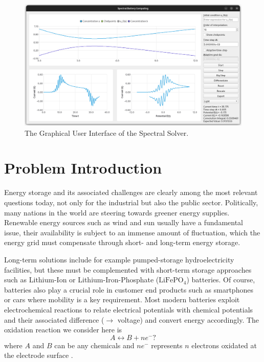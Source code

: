 \documentclass{prettytex/ox/mmsc-special-topic}
\begin{document}
  \begin{figure}[H]
    \centering
    \includegraphics[width=\linewidth]{figures/screenshot.png}
    \caption{The Graphical User Interface of the Spectral Solver.}
  \end{figure}

  \pagebreak
  \pagestyle{normal}

  \tableofcontents
  \pagebreak

  \section{Problem Introduction}
  \label{sec:introduction}
  Energy storage and its associated challenges are clearly among the most relevant questions today, not only for the industrial but also the public sector.
  Politically, many nations in the world are steering towards greener energy supplies.
  Renewable energy sources such as wind and sun usually have a fundamental issue, their availability is subject to an immense amount of fluctuation, which the energy grid must compensate through short- and long-term energy storage.

  Long-term solutions include for example pumped-storage hydroelectricity facilities, but these must be complemented with short-term storage approaches such as Lithium-Ion or Lithium-Iron-Phosphate ($\text{LiFePO}_4$) batteries.
  Of course, batteries also play a crucial role in customer end products such as smartphones or cars where mobility is a key requirement.
  Most modern batteries exploit electrochemical reactions to relate electrical potentials with chemical potentials and their associated difference ($\rightarrow$ voltage) and convert energy accordingly.
  The oxidation reaction we consider here is
  \begin{equation}
    A \leftrightarrow B + n e^-? \label{eq:oxidation-reaction}
  \end{equation}
  where $A$ and $B$ can be any chemicals and $n e^-$ represents $n$ electrons oxidated at the electrode surface \parencite{Gavaghan2000Jan}.
\end{document}
